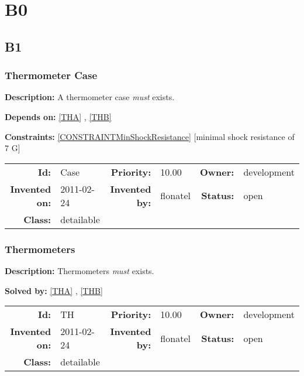 \chapter{B0}
\section{B1}
\subsection{Thermometer Case}\label{Case}
\textbf{Description:} A thermometer case \textsl{must} exists.

\textbf{Depends on:} \ref{THA} , \ref{THB} 

\textbf{Constraints:} \ref{CONSTRAINTMinShockResistance}  [minimal shock resistance of 7 G] 

\par
{\small \begin{center}\begin{tabular}{rlrlrl}
\textbf{Id:} & Case  & \textbf{Priority:} & 10.00  & \textbf{Owner:} & development\\ 
\textbf{Invented on:} & 2011-02-24  & \textbf{Invented by:} & flonatel  & \textbf{Status:} & open \\ 
\textbf{Class:} & detailable  & & & \end{tabular}\end{center} }

\subsection{Thermometers}\label{TH}
\textbf{Description:} Thermometers \textsl{must} exists.

\textbf{Solved by:} \ref{THA} , \ref{THB} 

\par
{\small \begin{center}\begin{tabular}{rlrlrl}
\textbf{Id:} & TH  & \textbf{Priority:} & 10.00  & \textbf{Owner:} & development\\ 
\textbf{Invented on:} & 2011-02-24  & \textbf{Invented by:} & flonatel  & \textbf{Status:} & open \\ 
\textbf{Class:} & detailable  & & & \end{tabular}\end{center} }

